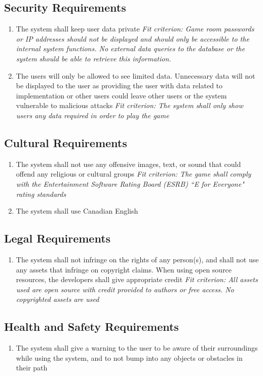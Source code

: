 \documentclass[12pt]{article}
\begin{document}
\subsection{Security Requirements}
\begin{enumerate}[SR\arabic*.]
    \item The system shall keep user data private\newline
    \textit{Fit criterion: Game room passwords or IP addresses should not be displayed and should only be accessible to the internal system functions. No external data queries to the database or the system should be able to retrieve this information.}
    \item The users will only be allowed to see limited data. Unnecessary data will not be displayed to the user as providing the user with data related to implementation or other users could leave other users or the system vulnerable to malicious attacks\newline
    \textit{Fit criterion: The system shall only show users any data required in order to play the game}
\end{enumerate}
\subsection{Cultural Requirements}
\begin{enumerate}[CR\arabic*]
    \item The system shall not use any offensive images, text, or sound that could offend any religious or cultural groups
    \textit{Fit criterion: The game shall comply with the Entertainment Software Rating Board (ESRB) ``E for Everyone" rating standards~\citep{ESRB}}
    \item The system shall use Canadian English
\end{enumerate}
\subsection{Legal Requirements}
\begin{enumerate}[LR\arabic*]
    \item The system shall not infringe on the rights of any person(s), and shall not use any assets that infringe on copyright claims. When using open source resources, the developers shall give appropriate credit
    \textit{Fit criterion: All assets used are open source with credit provided to authors or free access. No copyrighted assets are used}
\end{enumerate}
\subsection{Health and Safety Requirements}
\begin{enumerate}[HS\arabic*]
    \item The system shall give a warning to the user to be aware of their surroundings while using the system, and to not bump into any objects or obstacles in their path
\end{enumerate}
\end{document}
